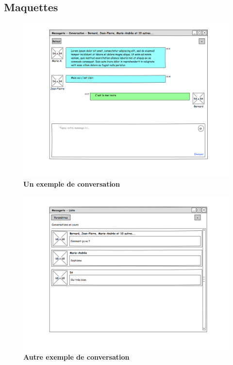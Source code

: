 \documentclass[11pt,dvipsnames,svgnames]{report}
\begin{document}
\subsection*{Maquettes}
\begin{center}
\begin{figure}
\includegraphics[width=\textwidth]{maquette/maquette1.png}
\caption{\textbf{Un exemple de conversation}}
\end{figure}

\begin{figure}
\includegraphics[width=\textwidth]{maquette/maquette2.png}
\caption{\textbf{Autre exemple de conversation}}
\end{figure}


\end{center}
\end{document}
